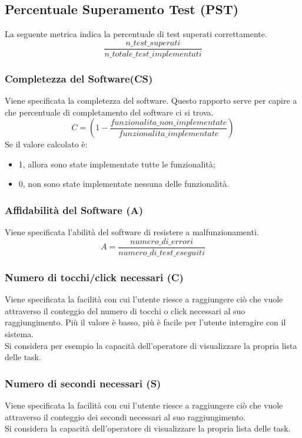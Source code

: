 \subsection{Percentuale Superamento Test (PST)}
La seguente metrica indica la percentuale di test superati correttamente.
\[\frac{n\_test\_superati}{n\_totale\_test\_implementati}\]

\subsubsection{Completezza del Software(CS)}
Viene specificata la completezza del software. Questo rapporto serve per capire a che percentuale di completamento del software ci si trova. 
\[C = (1- \frac{funzionalita\_non\_implementate }{funzionalita\_implementate})\]
Se il valore calcolato è:
\begin{itemize}
    \item 1, allora sono state implementate tutte le funzionalità;
    \item 0, non sono state implementate nessuna delle funzionalità.
\end{itemize}

\subsubsection{Affidabilità del Software (A)}
Viene specificata l'abilità del software di resistere a malfunzionamenti.
\[A = \frac{numero\_di\_errori}{numero\_di\_test\_eseguiti}\]

\subsubsection{Numero di tocchi/click necessari (C)}
Viene specificata la facilità con cui l'utente riesce a raggiungere ciò che vuole attraverso il conteggio del numero di tocchi o click necessari al suo raggiungimento. Più il valore è basso, più è facile per l'utente interagire con il sistema.\\
Si considera per esempio la capacità dell'operatore di visualizzare la propria lista delle task.

\subsubsection{Numero di secondi necessari (S)}
Viene specificata la facilità con cui l'utente riesce a raggiungere ciò che vuole attraverso il conteggio dei secondi necessari al suo raggiungimento.\\
Si considera la capacità dell'operatore di visualizzare la propria lista delle task.


